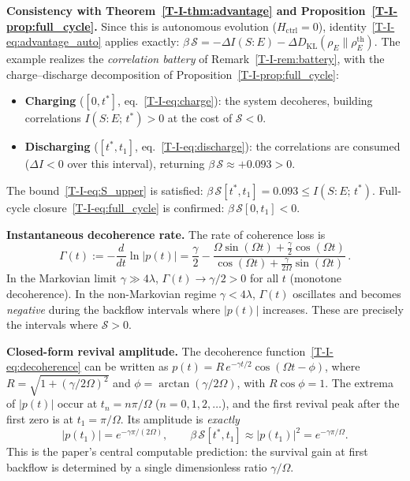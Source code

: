 \documentclass[12pt,a4paper,openany]{book}
\begin{document}
\textbf{Consistency with
Theorem~\ref{T-I-thm:advantage} and
Proposition~\ref{T-I-prop:full_cycle}.}
Since this is autonomous evolution ($H_{\mathrm{ctrl}} = 0$),
identity~\eqref{T-I-eq:advantage_auto} applies exactly:
$\beta\,\mathcal{S} = -\Delta I(S{:}E)
- \Delta D_{\mathrm{KL}}(\rho_E \| \rho_E^{\mathrm{th}})$.
The example realizes the \emph{correlation battery}
of Remark~\ref{T-I-rem:battery}, with the charge--discharge
decomposition of
Proposition~\ref{T-I-prop:full_cycle}:
\begin{itemize}
\item \textbf{Charging} ($[0, t^*]$, eq.~\eqref{T-I-eq:charge}):
  the system decoheres, building correlations
  $I(S{:}E;\, t^*) > 0$ at the cost of
  $\mathcal{S} < 0$.
\item \textbf{Discharging} ($[t^*, t_1]$,
  eq.~\eqref{T-I-eq:discharge}):
  the correlations are consumed
  ($\Delta I < 0$ over this interval),
  returning $\beta\,\mathcal{S} \approx +0.093 > 0$.
\end{itemize}
The bound~\eqref{T-I-eq:S_upper} is satisfied:
$\beta\,\mathcal{S}[t^*, t_1] = 0.093
\leq I(S{:}E;\, t^*)$.
Full-cycle closure~\eqref{T-I-eq:full_cycle} is confirmed:
$\beta\,\mathcal{S}[0, t_1] < 0$.

\textbf{Instantaneous decoherence rate.}
The rate of coherence loss is
\begin{equation}
\label{T-I-eq:Gamma_inst}
\Gamma(t) := -\frac{d}{dt}\ln|p(t)|
= \frac{\gamma}{2}
  - \frac{\Omega\sin(\Omega t)
    + \tfrac{\gamma}{2}\cos(\Omega t)}
  {\cos(\Omega t)
    + \tfrac{\gamma}{2\Omega}\sin(\Omega t)}\,.
\end{equation}
In the Markovian limit $\gamma \gg 4\lambda$,
$\Gamma(t) \to \gamma/2 > 0$ for all $t$
(monotone decoherence).
In the non-Markovian regime $\gamma < 4\lambda$,
$\Gamma(t)$ oscillates and becomes \emph{negative}
during the backflow intervals where $|p(t)|$ increases.
These are precisely the intervals where
$\mathcal{S} > 0$.

\textbf{Closed-form revival amplitude.}
The decoherence function~\eqref{T-I-eq:decoherence} can be
written as $p(t) = R\, e^{-\gamma t/2}\cos(\Omega t - \phi)$,
where $R = \sqrt{1 + (\gamma/2\Omega)^2}$ and
$\phi = \arctan(\gamma/2\Omega)$, with $R\cos\phi = 1$.
The extrema of $|p(t)|$ occur at $t_n = n\pi/\Omega$
($n = 0, 1, 2, \ldots$), and the first revival peak
after the first zero is at $t_1 = \pi/\Omega$.
Its amplitude is \emph{exactly}
\begin{equation}
\label{T-I-eq:revival_exact}
|p(t_1)| = e^{-\gamma\pi/(2\Omega)},
\qquad
\beta\,\mathcal{S}[t^*, t_1]
\approx |p(t_1)|^2
= e^{-\gamma\pi/\Omega}.
\end{equation}
This is the paper's central computable prediction: the
survival gain at first backflow is determined by a single
dimensionless ratio $\gamma/\Omega$.
\end{document}

